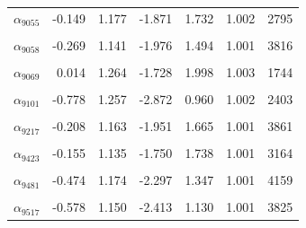 \begin{longtable}{lrrrrrr}
$\alpha_{9055}$ & -0.149 & 1.177 & -1.871 & 1.732 & 1.002 & 2795\\
\cellcolor{gray!10}{$\alpha_{9057}$} & \cellcolor{gray!10}{-0.921} & \cellcolor{gray!10}{1.342} & \cellcolor{gray!10}{-3.258} & \cellcolor{gray!10}{0.920} & \cellcolor{gray!10}{1.002} & \cellcolor{gray!10}{1523}\\
$\alpha_{9058}$ & -0.269 & 1.141 & -1.976 & 1.494 & 1.001 & 3816\\
\cellcolor{gray!10}{$\alpha_{9062}$} & \cellcolor{gray!10}{-0.276} & \cellcolor{gray!10}{1.195} & \cellcolor{gray!10}{-2.053} & \cellcolor{gray!10}{1.623} & \cellcolor{gray!10}{1.001} & \cellcolor{gray!10}{4691}\\
$\alpha_{9069}$ & 0.014 & 1.264 & -1.728 & 1.998 & 1.003 & 1744\\
\cellcolor{gray!10}{$\alpha_{9092}$} & \cellcolor{gray!10}{-0.693} & \cellcolor{gray!10}{1.183} & \cellcolor{gray!10}{-2.652} & \cellcolor{gray!10}{1.092} & \cellcolor{gray!10}{1.000} & \cellcolor{gray!10}{2674}\\
$\alpha_{9101}$ & -0.778 & 1.257 & -2.872 & 0.960 & 1.002 & 2403\\
\cellcolor{gray!10}{$\alpha_{9106}$} & \cellcolor{gray!10}{-0.393} & \cellcolor{gray!10}{1.183} & \cellcolor{gray!10}{-2.202} & \cellcolor{gray!10}{1.388} & \cellcolor{gray!10}{1.002} & \cellcolor{gray!10}{4337}\\
$\alpha_{9217}$ & -0.208 & 1.163 & -1.951 & 1.665 & 1.001 & 3861\\
\cellcolor{gray!10}{$\alpha_{9322}$} & \cellcolor{gray!10}{-0.564} & \cellcolor{gray!10}{1.142} & \cellcolor{gray!10}{-2.343} & \cellcolor{gray!10}{1.109} & \cellcolor{gray!10}{1.000} & \cellcolor{gray!10}{3653}\\
$\alpha_{9423}$ & -0.155 & 1.135 & -1.750 & 1.738 & 1.001 & 3164\\
\cellcolor{gray!10}{$\alpha_{9460}$} & \cellcolor{gray!10}{-0.679} & \cellcolor{gray!10}{1.205} & \cellcolor{gray!10}{-2.704} & \cellcolor{gray!10}{1.030} & \cellcolor{gray!10}{1.002} & \cellcolor{gray!10}{3063}\\
$\alpha_{9481}$ & -0.474 & 1.174 & -2.297 & 1.347 & 1.001 & 4159\\
\cellcolor{gray!10}{$\alpha_{9498}$} & \cellcolor{gray!10}{-0.136} & \cellcolor{gray!10}{1.150} & \cellcolor{gray!10}{-1.824} & \cellcolor{gray!10}{1.761} & \cellcolor{gray!10}{1.003} & \cellcolor{gray!10}{3023}\\
$\alpha_{9517}$ & -0.578 & 1.150 & -2.413 & 1.130 & 1.001 & 3825\\

\end{longtable}
